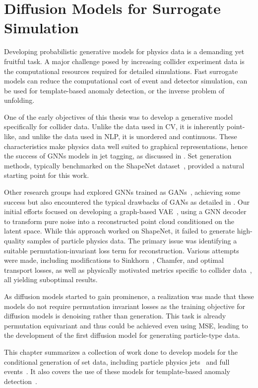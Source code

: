 \chapter{Diffusion Models for Surrogate Simulation}

Developing probabilistic generative models for physics data is a demanding yet fruitful task.
A major challenge posed by increasing collider experiment data is the computational resources required for detailed simulations.
Fast surrogate models can reduce the computational cost of event and detector simulation, can be used for template-based anomaly detection, or the inverse problem of unfolding.

One of the early objectives of this thesis was to develop a generative model specifically for collider data.
Unlike the data used in CV, it is inherently point-like, and unlike the data used in NLP, it is unordered and continuous.
These characteristics make physics data well suited to graphical representations, hence the success of GNNs models in jet tagging, as discussed in .
Set generation methods, typically benchmarked on the ShapeNet dataset~\cite{ShapeNet}, provided a natural starting point for this work.

Other research groups had explored GNNs trained as GANs~\cite{MPGAN}, achieving some success but also encountered the typical drawbacks of GANs as detailed in .
Our initial efforts focused on developing a graph-based VAE~\cite{SetVAE}, using a GNN decoder to transform pure noise into a reconstructed point cloud conditioned on the latent space.
While this approach worked on ShapeNet, it failed to generate high-quality samples of particle physics data.
The primary issue was identifying a suitable permutation-invariant loss term for reconstruction. Various attempts were made, including modifications to Sinkhorn~\cite{Sinkhorn}, Chamfer, and optimal transport losses, as well as physically motivated metrics specific to collider data~\cite{MetricSpaceCollider}, all yielding suboptimal results.

As diffusion models started to gain prominence, a realization was made that these models do not require permutation invariant losses as the training objective for diffusion models is denoising rather than generation.
This task is already permutation equivariant and thus could be achieved even using MSE, leading to the development of the first diffusion model for generating particle-type data.

This chapter summarizes a collection of work done to develop models for the conditional generation of set data, including particle physics jets~\cite{PCJedi, EpicJedi, PCDroid} and full events~\cite{PIPPIN}.
It also covers the use of these models for template-based anomaly detection~\cite{Drapes, RadOT}.

